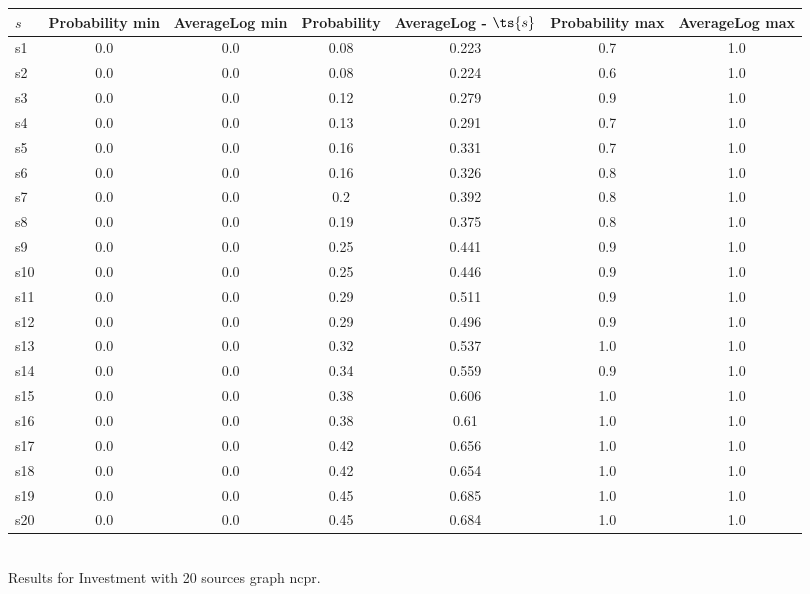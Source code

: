 \documentclass{article}
\begin{document}
\noindent\begin{tabular}{|l|c|c|c|c|c|c|}
\hline
$s$& Probability min & AverageLog min & Probability & AverageLog - $\ts{s}$ & Probability max & AverageLog max\\
\hline
s1 &0.0 & 0.0 & 0.08 & 0.223 & 0.7 & 1.0\\
\hline
s2 &0.0 & 0.0 & 0.08 & 0.224 & 0.6 & 1.0\\
\hline
s3 &0.0 & 0.0 & 0.12 & 0.279 & 0.9 & 1.0\\
\hline
s4 &0.0 & 0.0 & 0.13 & 0.291 & 0.7 & 1.0\\
\hline
s5 &0.0 & 0.0 & 0.16 & 0.331 & 0.7 & 1.0\\
\hline
s6 &0.0 & 0.0 & 0.16 & 0.326 & 0.8 & 1.0\\
\hline
s7 &0.0 & 0.0 & 0.2 & 0.392 & 0.8 & 1.0\\
\hline
s8 &0.0 & 0.0 & 0.19 & 0.375 & 0.8 & 1.0\\
\hline
s9 &0.0 & 0.0 & 0.25 & 0.441 & 0.9 & 1.0\\
\hline
s10 &0.0 & 0.0 & 0.25 & 0.446 & 0.9 & 1.0\\
\hline
s11 &0.0 & 0.0 & 0.29 & 0.511 & 0.9 & 1.0\\
\hline
s12 &0.0 & 0.0 & 0.29 & 0.496 & 0.9 & 1.0\\
\hline
s13 &0.0 & 0.0 & 0.32 & 0.537 & 1.0 & 1.0\\
\hline
s14 &0.0 & 0.0 & 0.34 & 0.559 & 0.9 & 1.0\\
\hline
s15 &0.0 & 0.0 & 0.38 & 0.606 & 1.0 & 1.0\\
\hline
s16 &0.0 & 0.0 & 0.38 & 0.61 & 1.0 & 1.0\\
\hline
s17 &0.0 & 0.0 & 0.42 & 0.656 & 1.0 & 1.0\\
\hline
s18 &0.0 & 0.0 & 0.42 & 0.654 & 1.0 & 1.0\\
\hline
s19 &0.0 & 0.0 & 0.45 & 0.685 & 1.0 & 1.0\\
\hline
s20 &0.0 & 0.0 & 0.45 & 0.684 & 1.0 & 1.0\\
\hline
\end{tabular}\\

\noindent Results for Investment with 20 sources graph ncpr.
\end{document}
